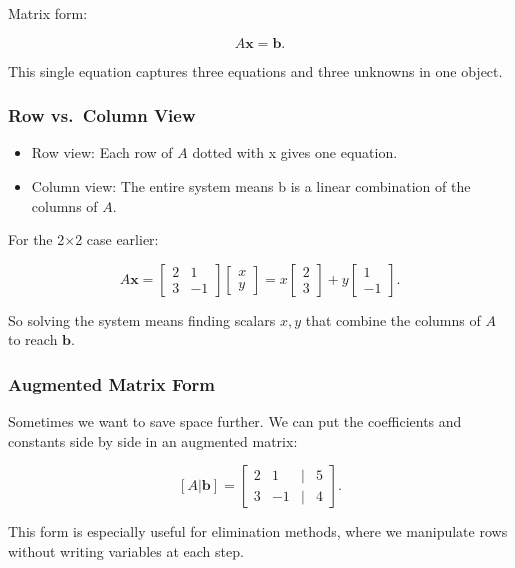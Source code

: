 \documentclass[
  letterpaper,
  DIV=11,
  numbers=noendperiod]{scrreprt}
\providecommand{\tightlist}{%
  \setlength{\itemsep}{0pt}\setlength{\parskip}{0pt}}
\begin{document}
Matrix form:

\[
A\mathbf{x} = \mathbf{b}.
\]

This single equation captures three equations and three unknowns in one
object.

\subsubsection{Row vs.~Column View}\label{row-vs.-column-view}

\begin{itemize}
\tightlist
\item
  Row view: Each row of \(A\) dotted with x gives one equation.
\item
  Column view: The entire system means b is a linear combination of the
  columns of \(A\).
\end{itemize}

For the 2×2 case earlier:

\[
A\mathbf{x} = \begin{bmatrix} 2 & 1 \\ 3 & -1 \end{bmatrix}  
\begin{bmatrix} x \\ y \end{bmatrix}  
= x \begin{bmatrix} 2 \\ 3 \end{bmatrix} + y \begin{bmatrix} 1 \\ -1 \end{bmatrix}.
\]

So solving the system means finding scalars \(x, y\) that combine the
columns of \(A\) to reach \(\mathbf{b}\).

\subsubsection{Augmented Matrix Form}\label{augmented-matrix-form}

Sometimes we want to save space further. We can put the coefficients and
constants side by side in an augmented matrix:

\[
[A | \mathbf{b}] =  
\begin{bmatrix}  
2 & 1 & | & 5 \\  
3 & -1 & | & 4  
\end{bmatrix}.
\]

This form is especially useful for elimination methods, where we
manipulate rows without writing variables at each step.
\end{document}
